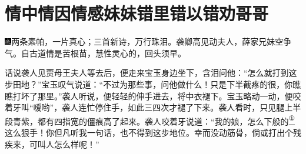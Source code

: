 

\chapter{情中情因情感妹妹\hspace{.5em}错里错以错劝哥哥}

{\includegraphics[width=3mm]{../Images/00005}两条素帕，一片真心；三首新诗，万行珠泪。袭卿高见动夫人，薛家兄妹空争气。自古道情是苦根苗，慧性灵心的，回头须早。}

话说袭人见贾母王夫人等去后，便走来宝玉身边坐下，含泪问他：``怎么就打到这步田地？''宝玉叹气说道：``不过为那些事，问他做什么！只是下半截疼的很，你瞧瞧打坏了那里。''袭人听说，便轻轻的伸手进去，将中衣褪下。宝玉略动一动，便咬着牙叫``嗳哟''，袭人连忙停住手，如此三四次才褪了下来。袭人看时，只见腿上半段青紫，都有四指宽的僵痕高了起来。袭人咬着牙说道：``我的娘，怎么下般的\href{../Text/part0038_split_000.html\#lnkback_1_a}{\textsuperscript{①}}这么狠手！你但凡听我一句话，也不得到这步地位。幸而没动筋骨，倘或打出个残疾来，可叫人怎么样呢！''


